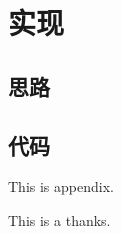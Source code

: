 \documentclass[twoside,UTF8]{nputhesis}
\begin{document}
\chapter{实现}
\section{思路}
\section{代码}


\backmatter



\Appendix
This is appendix.

\Thanks
This is a thanks.

\Work

\statement
\end{document}
